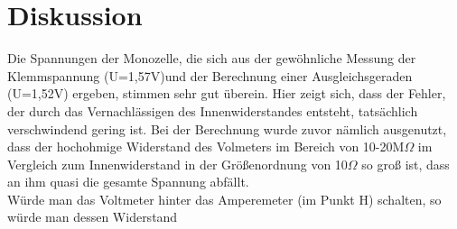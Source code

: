 \section{Diskussion}
Die Spannungen der Monozelle, die sich aus der gewöhnliche Messung der Klemmspannung (U=1,57V)und der Berechnung einer Ausgleichsgeraden (U=1,52V) ergeben, stimmen sehr gut überein. Hier zeigt sich, dass der Fehler, der durch das Vernachlässigen des Innenwiderstandes entsteht, tatsächlich verschwindend gering ist. Bei der Berechnung wurde zuvor nämlich ausgenutzt, dass der hochohmige Widerstand des Volmeters im Bereich von 10-20M$\Omega$ im Vergleich zum Innenwiderstand in der Größenordnung von 10$\Omega$ so groß ist, dass an ihm quasi die gesamte Spannung abfällt.\\
Würde man das Voltmeter hinter das Amperemeter (im Punkt H) schalten, so würde man dessen Widerstand 





